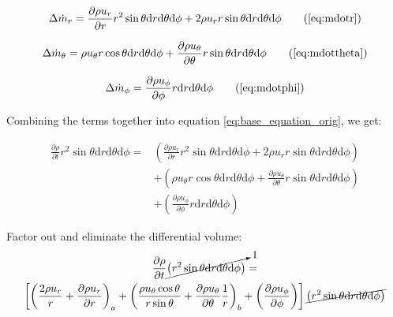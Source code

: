 \documentclass[12pt, letterpaper, twoside]{article}
\begin{document}
    \begin{equation}
        \Delta\dot{m}_r = \frac{\partial \rho u_r}{\partial r} r^2 \sin\theta \textrm{d}r \textrm{d}\theta \textrm{d}\phi +
        2\rho u_r r\sin\theta \textrm{d}r \textrm{d}\theta \textrm{d}\phi
        \tag{\ref{eq:mdotr}}
    \end{equation}

    \begin{equation}
        \Delta\dot{m}_{\theta} = 
        \rho u_{\theta} r\cos\theta \textrm{d}r \textrm{d}\theta \textrm{d}\phi + 
        \frac{\partial\rho u_{\theta}}{\partial\theta} r\sin\theta \textrm{d}r \textrm{d}\theta \textrm{d}\phi
        \tag{\ref{eq:mdottheta}}
    \end{equation}

    \begin{equation}
        \Delta\dot{m}_{\phi} = \frac{\partial \rho u_{\phi}}{\partial \phi} r \textrm{d}r \textrm{d}\theta \textrm{d}\phi 
        \tag{\ref{eq:mdotphi}}
    \end{equation}

    Combining the terms together into equation \ref{eq:base_equation_orig}, we get:

    \begin{equation}
        \begin{split}
        \frac{\partial \rho}{\partial t} r^2 \sin\theta \textrm{d}r \textrm{d}\theta \textrm{d}\phi = &
        \left(\frac{\partial \rho u_r}{\partial r} r^2 \sin\theta \textrm{d}r \textrm{d}\theta \textrm{d}\phi +
        2\rho u_r r\sin\theta \textrm{d}r \textrm{d}\theta \textrm{d}\phi \right) \\
        & + \left(\rho u_{\theta} r\cos\theta \textrm{d}r \textrm{d}\theta \textrm{d}\phi + 
        \frac{\partial\rho u_{\theta}}{\partial\theta} r\sin\theta \textrm{d}r \textrm{d}\theta \textrm{d}\phi \right) \\ 
        & + \left(\frac{\partial \rho u_{\phi}}{\partial \phi} r \textrm{d}r \textrm{d}\theta \textrm{d}\phi \right)
        \end{split}
    \end{equation}

    Factor out and eliminate the differential volume:
    \begin{multline*}
        \frac{\partial \rho}{\partial t} \cancelto{1}{\left( r^2 \sin\theta \textrm{d}r \textrm{d}\theta \textrm{d}\phi \right)} = \\
        \left[
        \left(\frac{2 \rho u_r}{r} + \frac{\partial \rho u_r}{\partial r} \right)_a
        + \left(\frac{\rho u_{\theta} \cos\theta}{r \sin\theta} + 
        \frac{\partial\rho u_{\theta}}{\partial\theta} \frac{1}{r} \right)_b
        + \left(\frac{\partial \rho u_{\phi}}{\partial \phi} \right)
        \right] \cancel{\left( r^2 \sin\theta \textrm{d}r \textrm{d}\theta \textrm{d}\phi \right)}
    \end{multline*}
\end{document}
